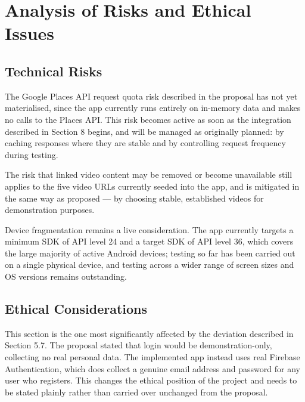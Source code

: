 \documentclass[12pt, a4paper]{article}
\begin{document}
\section{Analysis of Risks and Ethical Issues}

\subsection{Technical Risks}

The Google Places API request quota risk described in the proposal has not yet materialised, since the app currently runs entirely on in-memory data and makes no calls to the Places API. This risk becomes active as soon as the integration described in Section 8 begins, and will be managed as originally planned: by caching responses where they are stable and by controlling request frequency during testing.

The risk that linked video content may be removed or become unavailable still applies to the five video URLs currently seeded into the app, and is mitigated in the same way as proposed — by choosing stable, established videos for demonstration purposes.

Device fragmentation remains a live consideration. The app currently targets a minimum SDK of API level 24 and a target SDK of API level 36, which covers the large majority of active Android devices; testing so far has been carried out on a single physical device, and testing across a wider range of screen sizes and OS versions remains outstanding.

\subsection{Ethical Considerations}

This section is the one most significantly affected by the deviation described in Section 5.7. The proposal stated that login would be demonstration-only, collecting no real personal data. The implemented app instead uses real Firebase Authentication, which does collect a genuine email address and password for any user who registers. This changes the ethical position of the project and needs to be stated plainly rather than carried over unchanged from the proposal.
\end{document}
